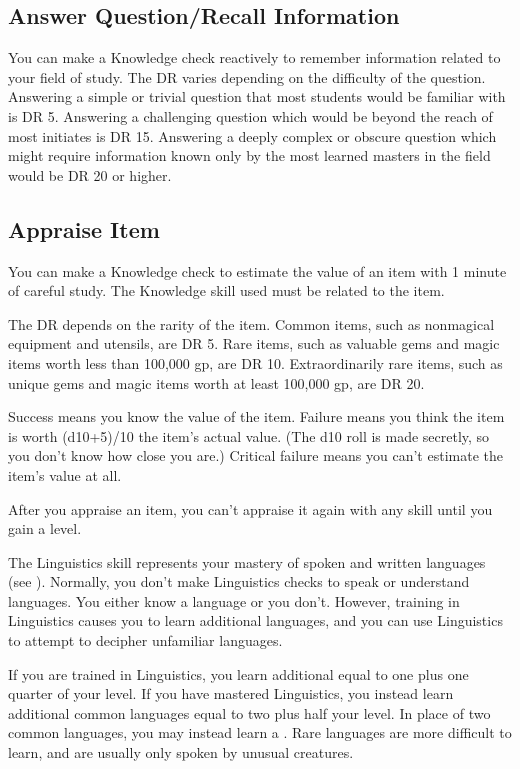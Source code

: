     \subsection{Answer Question/Recall Information}
        You can make a Knowledge check reactively to remember information related to your field of study. The DR varies depending on the difficulty of the question. Answering a simple or trivial question that most students would be familiar with is DR 5. Answering a challenging question which would be beyond the reach of most initiates is DR 15. Answering a deeply complex or obscure question which might require information known only by the most learned masters in the field would be DR 20 or higher.

    \subsection{Appraise Item}
        You can make a Knowledge check to estimate the value of an item with 1 minute of careful study. The Knowledge skill used must be related to the item.

        The DR depends on the rarity of the item. Common items, such as nonmagical equipment and utensils, are DR 5. Rare items, such as valuable gems and magic items worth less than 100,000 gp, are DR 10. Extraordinarily rare items, such as unique gems and magic items worth at least 100,000 gp, are DR 20.

        Success means you know the value of the item. Failure means you think the item is worth (d10+5)/10 \x the item's actual value. (The d10 roll is made secretly, so you don't know how close you are.) Critical failure means you can't estimate the item's value at all.

        After you appraise an item, you can't appraise it again with any skill until you gain a level.

\newpage
{}
        The Linguistics skill represents your mastery of spoken and written languages (see ).
        Normally, you don't make Linguistics checks to speak or understand languages.
        You either know a language or you don't.
        However, training in Linguistics causes you to learn additional languages, and you can use Linguistics to attempt to decipher unfamiliar languages.

        \label{Learning Languages}
        If you are trained in Linguistics, you learn additional  equal to one plus one quarter of your level.
        If you have mastered Linguistics, you instead learn additional common languages equal to two plus half your level.
        In place of two common languages, you may instead learn a .
        Rare languages are more difficult to learn, and are usually only spoken by unusual creatures.

